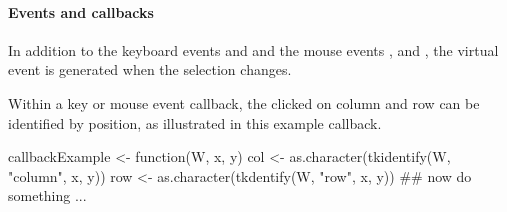 \paragraph{Events and callbacks}
In addition to the keyboard events  and
 and the mouse events ,
 and , the virtual event
 is generated when the selection changes.

Within a key or mouse event callback, the clicked on column and row can
be identified by position, as illustrated in this example callback.
\begin{Schunk}
\begin{Sinput}
 callbackExample <- function(W, x, y) {
   col <- as.character(tkidentify(W, "column", x, y))
   row <- as.character(tkdentify(W, "row", x, y))
   ## now do something ...
 }
\end{Sinput}
\end{Schunk}


